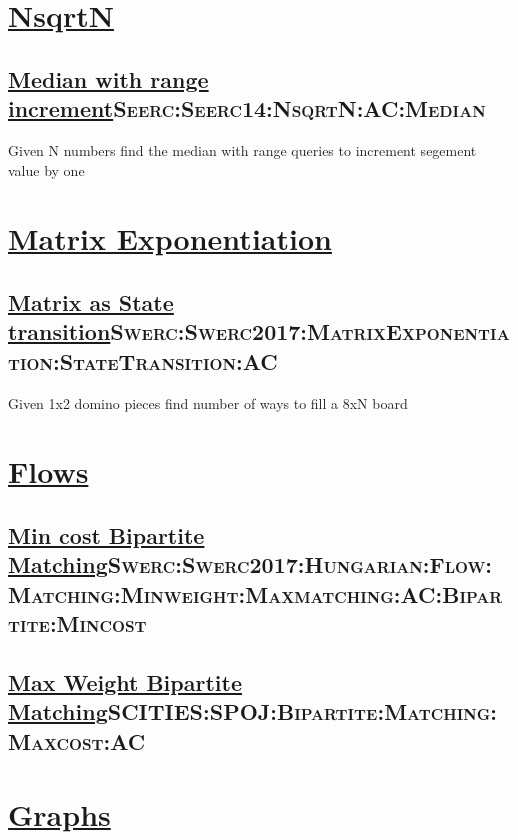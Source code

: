 \documentclass[11pt]{article}
\date{\today}
\title{}
\begin{document}
\tableofcontents

\section{\href{./NsqerN}{NsqrtN}}
\label{sec:org85d1e00}
\subsection{\href{./NsqrtN/MedianRangeIncrement.cc}{Median with range increment}\hfill{}\textsc{Seerc:Seerc14:NsqrtN:AC:Median}}
\label{sec:org71d4206}
Given N numbers find the median with range queries to increment segement value by one


\section{\href{./MatrixExponentiation}{Matrix Exponentiation}}
\label{sec:org7a4035e}
\subsection{\href{./MatrixExponentiation/StateExponentiation.cc}{Matrix as State transition}\hfill{}\textsc{Swerc:Swerc2017:MatrixExponentiation:StateTransition:AC}}
\label{sec:org800690e}
Given 1x2 domino pieces find number of ways to fill a 8xN board


\section{\href{./Flows}{Flows}}
\label{sec:org6a9d455}
\subsection{\href{./Flows/MinimumCostMatching.cc}{Min cost Bipartite Matching}\hfill{}\textsc{Swerc:Swerc2017:Hungarian:Flow:Matching:Minweight:Maxmatching:AC:Bipartite:Mincost}}
\label{sec:org343bf3a}

\subsection{\href{./Flows/MaxWeightBipartiteMatching.cc}{Max Weight Bipartite Matching}\hfill{}\textsc{SCITIES:SPOJ:Bipartite:Matching:Maxcost:AC}}
\label{sec:org4701425}


\section{\href{./Graphs/}{Graphs}}
\label{sec:org0b4d9d2}
\end{document}
